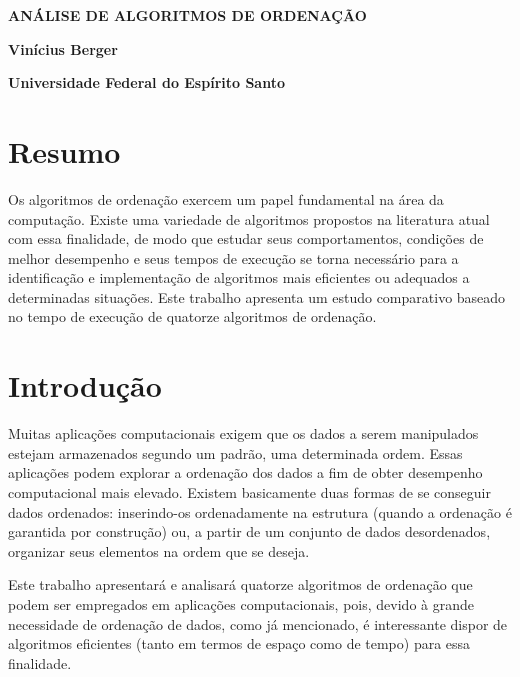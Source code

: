\documentclass[12pt,a4paper]{article}
\author{Vinícius Berger}
\begin{document}
\begin{center}\textbf{
\large ANÁLISE DE ALGORITMOS DE ORDENAÇÃO\\
}
\end{center}

\begin{center}\textbf{
\normalsize Vinícius Berger
}
\end{center}

\begin{center}\textbf{
\normalsize Universidade Federal do Espírito Santo
}
\end{center}





\section*{Resumo}
Os algoritmos de ordenação exercem um papel fundamental na área da computação. Existe uma variedade de algoritmos propostos na literatura atual com essa finalidade, de modo que estudar seus comportamentos, condições de melhor desempenho e seus tempos de execução se torna necessário para a identificação e implementação de algoritmos mais eficientes ou adequados a determinadas situações. Este trabalho apresenta um estudo comparativo baseado no tempo de execução de quatorze algoritmos de ordenação.




\section{Introdução}

Muitas aplicações computacionais exigem que os dados a serem manipulados estejam armazenados segundo um padrão, uma determinada ordem. Essas aplicações podem explorar a ordenação dos dados a fim de obter desempenho computacional mais elevado. Existem basicamente duas formas de se conseguir dados ordenados: inserindo-os ordenadamente na estrutura (quando a ordenação é garantida por construção) ou, a partir de um conjunto de dados desordenados, organizar seus elementos na ordem que se deseja.

Este trabalho apresentará e analisará quatorze algoritmos de ordenação que podem ser empregados em aplicações computacionais, pois, devido à grande necessidade de ordenação de dados, como já mencionado, é interessante dispor de algoritmos eficientes (tanto em termos de espaço como de tempo) para essa finalidade. 
\end{document}
